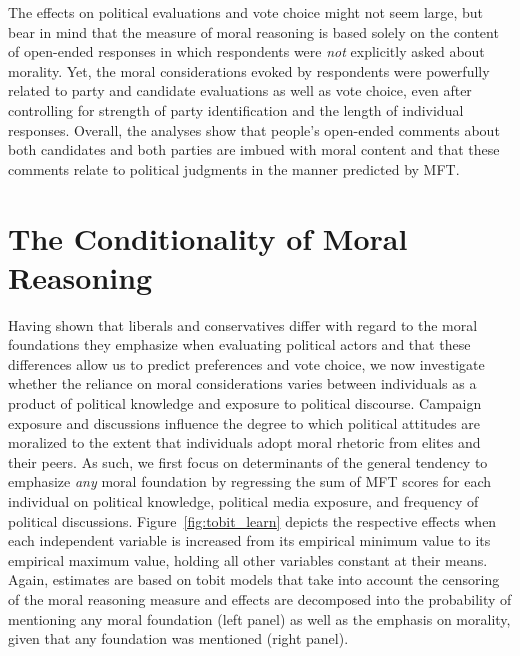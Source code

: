 \documentclass[12pt]{article}
\begin{document}
The effects on political evaluations and vote choice might not seem large, but bear in mind that the measure of moral reasoning is based solely on the content of open-ended responses in which respondents were \textit{not} explicitly asked about morality. Yet, the moral considerations evoked by respondents were powerfully related to party and candidate evaluations as well as vote choice, even after controlling for strength of party identification and the length of individual responses. Overall, the analyses show that people's open-ended comments about both candidates and both parties are imbued with moral content and that these comments relate to political judgments in the manner predicted by MFT.


\section*{The Conditionality of Moral Reasoning}

Having shown that liberals and conservatives differ with regard to the moral foundations they emphasize when evaluating political actors and that these differences allow us to predict preferences and vote choice, we now investigate whether the reliance on moral considerations varies between individuals as a product of political knowledge and exposure to political discourse. Campaign exposure and discussions influence the degree to which political attitudes are moralized to the extent that individuals adopt moral rhetoric from elites and their peers. As such, we first focus on determinants of the general tendency to emphasize \textit{any} moral foundation by regressing the sum of MFT scores for each individual on political knowledge, political media exposure, and frequency of political discussions. Figure~\ref{fig:tobit_learn} depicts the respective effects when each independent variable is increased from its empirical minimum value to its empirical maximum value, holding all other variables constant at their means. Again, estimates are based on tobit models that take into account the censoring of the moral reasoning measure and effects are decomposed into the probability of mentioning any moral foundation (left panel) as well as the emphasis on morality, given that any foundation was mentioned (right panel).
\end{document}
